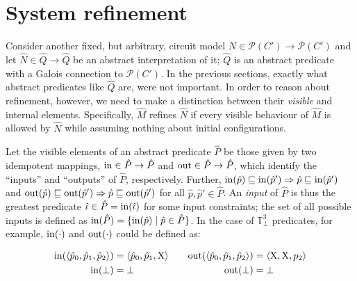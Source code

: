 \section{System refinement}

Consider another fixed, but arbitrary, circuit model $N \in \mathcal{P}(C') \rightarrow \mathcal{P}(C')$ and let $\hat N \in \hat Q \rightarrow \hat Q$ be an abstract interpretation of it; $\hat Q$ is an abstract predicate with a Galois connection to $\mathcal{P}(C')$. In the previous sections, exactly what abstract predicates like $\hat Q$ are, were not important. In order to reason about refinement, however, we need to make a distinction between their \textit{visible} and internal elements. Specifically,  $\hat M$ refines $\hat N$ if every visible behaviour of $\hat M$ is allowed by $\hat N$ while assuming nothing about initial configurations.

Let the visible elements of an abstract predicate $\hat P$ be those given by two idempotent mappings, $\operatorname{in} \in \hat P \rightarrow \hat P$ and $\operatorname{out} \in \hat P \rightarrow \hat P$, which identify the ``inputs'' and ``outputs'' of $\hat P$, respectively. Further, $\operatorname{in}(\hat p) \sqsubseteq \operatorname{in}(\hat p') \Rightarrow \hat p \sqsubseteq \operatorname{in}(\hat p')$ and $\operatorname{out}(\hat p) \sqsubseteq \operatorname{out}(\hat p') \Rightarrow \hat p \sqsubseteq \operatorname{out}(\hat p')$ for all $\hat p, \hat p' \in \hat P$. An \textit{input} of $\hat P$ is thus the greatest predicate $\hat \iota \in \hat P = \operatorname{in}(\hat \iota)$ for some input constraints; the set of all possible inputs is defined as $\operatorname{in}(\hat P) = \{ \operatorname{in}(\hat p) \mid \hat p \in \hat P \}$. In the case of $\mathbb{T}_{\bot}^{3}$ predicates, for example, $\operatorname{in}(\cdot)$ and $\operatorname{out}(\cdot)$ could be defined as:


\begin{equation*}
\begin{aligned}[t]
\operatorname{in}(\langle \hat p_{0}, \hat p_{1}, \hat p_{2} \rangle) &= \langle \hat p_{0}, \hat p_{1}, \mathrm{X} \rangle \\
\operatorname{in}(\bot) &= \bot
\end{aligned}
\qquad
\begin{aligned}[t]
\operatorname{out}(\langle \hat p_{0}, \hat p_{1}, \hat p_{2} \rangle) &= \langle \mathrm{X}, \mathrm{X}, p_{2} \rangle \\
\operatorname{out}(\bot) &= \bot
\end{aligned}
\end{equation*}

